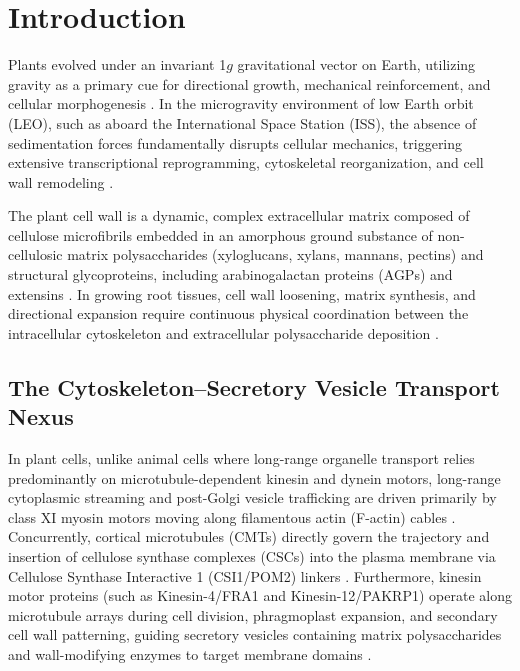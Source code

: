\section{Introduction}

Plants evolved under an invariant 1$g$ gravitational vector on Earth, utilizing gravity as a primary cue for directional growth, mechanical reinforcement, and cellular morphogenesis \cite{Blancaflor2016, Gilroy2016}. In the microgravity environment of low Earth orbit (LEO), such as aboard the International Space Station (ISS), the absence of sedimentation forces fundamentally disrupts cellular mechanics, triggering extensive transcriptional reprogramming, cytoskeletal reorganization, and cell wall remodeling \cite{Ferl2015, Paul2017, Barker2020}. 

The plant cell wall is a dynamic, complex extracellular matrix composed of cellulose microfibrils embedded in an amorphous ground substance of non-cellulosic matrix polysaccharides (xyloglucans, xylans, mannans, pectins) and structural glycoproteins, including arabinogalactan proteins (AGPs) and extensins \cite{Cosgrove2005, Somerville2004}. In growing root tissues, cell wall loosening, matrix synthesis, and directional expansion require continuous physical coordination between the intracellular cytoskeleton and extracellular polysaccharide deposition \cite{Paredez2006, Gutierrez2009}.

\subsection{The Cytoskeleton--Secretory Vesicle Transport Nexus}

In plant cells, unlike animal cells where long-range organelle transport relies predominantly on microtubule-dependent kinesin and dynein motors, long-range cytoplasmic streaming and post-Golgi vesicle trafficking are driven primarily by class XI myosin motors moving along filamentous actin (F-actin) cables \cite{Sparkes2009, Peremyslov2010}. Concurrently, cortical microtubules (CMTs) directly govern the trajectory and insertion of cellulose synthase complexes (CSCs) into the plasma membrane via Cellulose Synthase Interactive 1 (CSI1/POM2) linkers \cite{Bringmann2012, Li2012}. Furthermore, kinesin motor proteins (such as Kinesin-4/FRA1 and Kinesin-12/PAKRP1) operate along microtubule arrays during cell division, phragmoplast expansion, and secondary cell wall patterning, guiding secretory vesicles containing matrix polysaccharides and wall-modifying enzymes to target membrane domains \cite{Zhong2002, Lee2007}.

